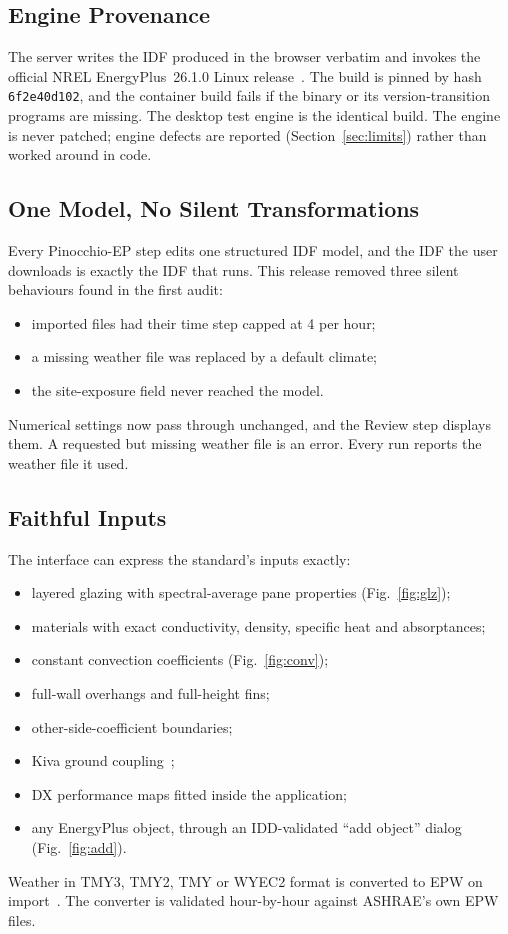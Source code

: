 \documentclass[conference,10pt]{IEEEtran}
\newcommand{\code}[1]{\texttt{\footnotesize #1}}
\begin{document}
\subsection{Engine Provenance}
The server writes the IDF produced in the browser verbatim and invokes the official NREL EnergyPlus~26.1.0 Linux
release~\cite{eplus}. The build is pinned by hash \code{6f2e40d102}, and the container build fails if the binary or
its version-transition programs are missing. The desktop test engine is the identical build. The engine is never
patched; engine defects are reported (Section~\ref{sec:limits}) rather than worked around in code.

\subsection{One Model, No Silent Transformations}
Every Pinocchio-EP step edits one structured IDF model, and the IDF the user downloads is exactly the IDF that runs.
This release removed three silent behaviours found in the first audit:
\begin{itemize}
\item imported files had their time step capped at 4 per hour;
\item a missing weather file was replaced by a default climate;
\item the site-exposure field never reached the model.
\end{itemize}
Numerical settings now pass through unchanged, and the Review step displays them. A requested but missing weather
file is an error. Every run reports the weather file it used.

\subsection{Faithful Inputs}
The interface can express the standard's inputs exactly:
\begin{itemize}
\item layered glazing with spectral-average pane properties (Fig.~\ref{fig:glz});
\item materials with exact conductivity, density, specific heat and absorptances;
\item constant convection coefficients (Fig.~\ref{fig:conv});
\item full-wall overhangs and full-height fins;
\item other-side-coefficient boundaries;
\item Kiva ground coupling~\cite{kiva};
\item DX performance maps fitted inside the application;
\item any EnergyPlus object, through an IDD-validated ``add object'' dialog (Fig.~\ref{fig:add}).
\end{itemize}
Weather in TMY3, TMY2, TMY or WYEC2 format is converted to EPW on import~\cite{tmy3}. The converter is validated
hour-by-hour against ASHRAE's own EPW files.
\end{document}
